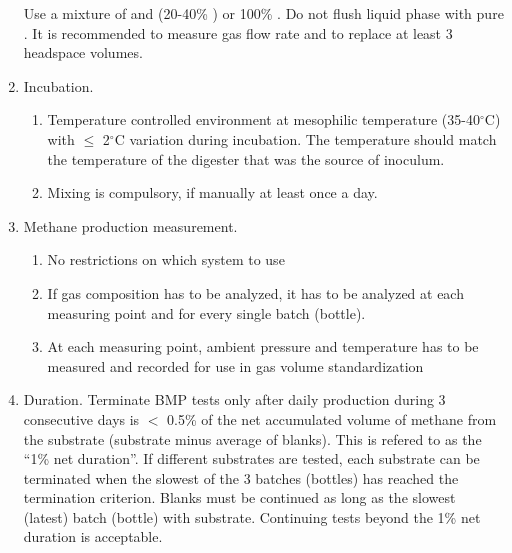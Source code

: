 \documentclass[]{article}
\begin{document}
\begin{enumerate}
    Use a mixture of  and  (20-40\% ) or 100\% . Do not flush liquid phase with pure . 
    It is recommended to measure gas flow rate and to replace at least 3 headspace volumes.
  \item Incubation.
    \begin{enumerate}
      \item Temperature controlled environment at mesophilic temperature (35-40$^\circ$C) with $\le$ 2$^\circ$C variation during incubation. 
        The temperature should match the temperature of the digester that was the source of inoculum.
      \item Mixing is compulsory, if manually at least once a day.
    \end{enumerate}
  \item Methane production measurement.
    \begin{enumerate}
      \item No restrictions on which system to use
      \item If gas composition has to be analyzed, it has to be analyzed at each measuring point and for every single batch (bottle).
      \item At each measuring point, ambient pressure and temperature has to be measured and recorded for use in gas volume standardization
    \end{enumerate}
  \item Duration. 
    Terminate BMP tests only after daily  production during 3 consecutive days is $<$ 0.5\% of the net accumulated volume of methane from the substrate (substrate minus average of blanks). 
    This is refered to as the ``1\% net duration''.
    If different substrates are tested, each substrate can be terminated when the slowest of the 3 batches (bottles) has reached the termination criterion.
    Blanks must be continued as long as the slowest (latest) batch (bottle) with substrate.
    Continuing tests beyond the 1\% net duration is acceptable.
\end{enumerate}
\end{document}
